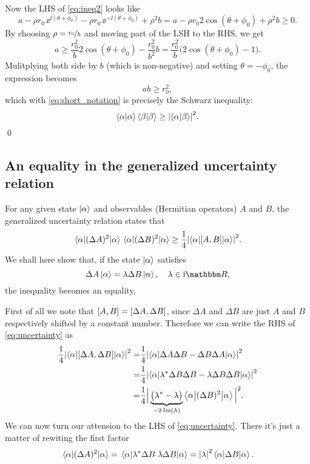 \documentclass[11pt,letter, swedish, english
]{article}
\begin{document}
Now the LHS of \eqref{eq:ineq2} looks like
\begin{equation}
a -\rho r_0\,\ee^{\ii(\theta + \phi_0)} 
-\rho r_0\,\ee^{-\ii(\theta+\phi_0)} + \rho^2b 
= a - \rho r_0 2\cos(\theta+\phi_0) + \rho^2b \ge 0.
\end{equation}
By choosing $\rho=\nicefrac{r_0}{b}$ and moving part of the LSH to
the RHS, we get
\begin{equation}
a \ge  \frac{r_0^2}{b} 2\cos(\theta+\phi_0) - \frac{r_0^2}{b^2}b 
= \frac{r_0^2}{b} \Big( 2\cos(\theta+\phi_0) - 1 \Big).
\end{equation}
Mulitplying both side by $b$ (which is non-negative) and setting
$\theta=-\phi_0$, the expression becomes
\begin{equation}
ab \ge r_0^2,
\end{equation}
which with \eqref{eq:short_notation} is precisely the Schwarz
inequality:
\begin{equation}
\braket{\alpha}\braket{\beta} \ge \abs{\braket{\alpha}{\beta}}^2.
\end{equation}
\qed

\subsection{An equality in the generalized uncertainty relation}
For any given state $\ket{\alpha}$ and observables (Hermitian
operators) $A$ and $B$, the generalized uncertainty relation states that
\begin{equation} \label{eq:uncertainty}
\ev{(\Delta{A})^2}{\alpha}\ev{(\Delta{B})^2}{\alpha} 
\ge \frac{1}{4} \abs{\ev**{\comm{A}{B}}{\alpha}}^2.
\end{equation}
We shall here show that, if the state $\ket{\alpha}$ satisfies
\begin{equation}
\Delta{A}\ket{\alpha}=\lambda \Delta{B}\ket{\alpha}\qcomma \lambda \in \ii\R,
\end{equation}
the inequality becomes an equality.

First of all we note that $\comm{A}{B}=\comm{\Delta{A}}{\Delta{B}}$,
since $\Delta{A}$ and $\Delta{B}$ are just $A$ and $B$ respectively
shifted by a constant number. Therefore we can write the RHS of
\eqref{eq:uncertainty} as
\begin{equation}
\begin{aligned}
\frac{1}{4} \abs{\ev**{\comm{\Delta{A}}{\Delta{B}}}{\alpha}}^2 
=& \frac{1}{4} 
  \abs{\ev**{\Delta{A}\Delta{B} -\Delta{B}\Delta{A}}{\alpha}}^2 \\
=& \frac{1}{4} \abs{
    \ev**{\lambda^*\Delta{B}\Delta{B} - \lambda\Delta{B}\Delta{B}}{\alpha}
   }^2\\
=& \frac{1}{4} \Big| \underbrace{\big(\lambda^*-\lambda\big)}_{-2\Im(\lambda)}
\ev**{(\Delta{B})^2}{\alpha} \Big|^2.
\end{aligned}
\end{equation}
We can now turn our attension to the LHS of
\eqref{eq:uncertainty}. There it's just a matter of rewiting the first
factor
\begin{equation}
\ev{(\Delta{A})^2}{\alpha} 
= \ev{\lambda^*\Delta{B}\;\lambda\Delta{B}}{\alpha} 
= \abs{\lambda}^2 \ev{\Delta{B}}{\alpha}.
\end{equation}
\end{document}
